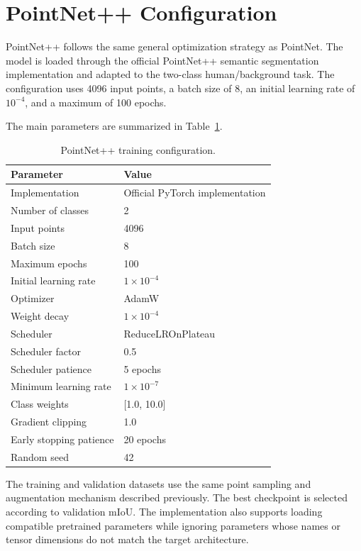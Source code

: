 \section{PointNet++ Configuration}
\label{app:pointnet2_configuration}

PointNet++ follows the same general optimization strategy as PointNet. The model is loaded through the official PointNet++ semantic segmentation implementation and adapted to the two-class human/background task. The configuration uses 4096 input points, a batch size of 8, an initial learning rate of $10^{-4}$, and a maximum of 100 epochs.

The main parameters are summarized in Table~\ref{tab:app_pointnet2_config}.

\begin{table}[H]
\centering
\caption{PointNet++ training configuration.}
\label{tab:app_pointnet2_config}
\begin{tabular}{|l|l|}
\hline
\textbf{Parameter} & \textbf{Value} \\
\hline
Implementation & Official PyTorch implementation \\
Number of classes & 2 \\
Input points & 4096 \\
Batch size & 8 \\
Maximum epochs & 100 \\
Initial learning rate & $1\times10^{-4}$ \\
Optimizer & AdamW \\
Weight decay & $1\times10^{-4}$ \\
Scheduler & ReduceLROnPlateau \\
Scheduler factor & 0.5 \\
Scheduler patience & 5 epochs \\
Minimum learning rate & $1\times10^{-7}$ \\
Class weights & [1.0, 10.0] \\
Gradient clipping & 1.0 \\
Early stopping patience & 20 epochs \\
Random seed & 42 \\
\hline
\end{tabular}
\end{table}

The training and validation datasets use the same point sampling and augmentation mechanism described previously. The best checkpoint is selected according to validation mIoU. The implementation also supports loading compatible pretrained parameters while ignoring parameters whose names or tensor dimensions do not match the target architecture.

